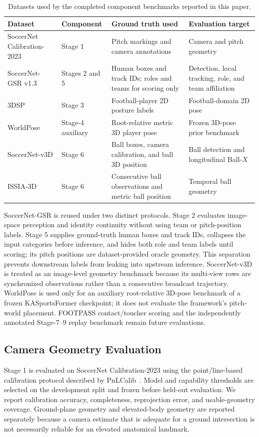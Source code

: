 \documentclass[runningheads]{llncs}
\begin{document}
\begin{table}[t]
\caption{Datasets used by the completed component benchmarks reported in this paper.}
\label{tab:datasets}
\centering\small
\setlength{\tabcolsep}{4pt}
\begin{tabularx}{\textwidth}{@{}p{3.0cm}p{2.4cm}X X@{}}
\toprule
Dataset & Component & Ground truth used & Evaluation target \\
\midrule
SoccerNet Calibration-2023 & Stage 1 & Pitch markings and camera annotations & Camera and pitch geometry \\
SoccerNet-GSR v1.3 & Stages 2 and 5 & Human boxes and track IDs; roles and teams for scoring only & Detection, local tracking, role, and team affiliation \\
3DSP & Stage 3 & Football-player 2D posture labels & Football-domain 2D pose \\
WorldPose & Stage-4 auxiliary & Root-relative metric 3D player pose & Frozen 3D-pose prior benchmark \\
SoccerNet-v3D & Stage 6 & Ball boxes, camera calibration, and ball 3D position & Ball detection and longitudinal Ball-$X$ \\
ISSIA-3D & Stage 6 & Consecutive ball observations and metric ball position & Temporal ball geometry \\
\bottomrule
\end{tabularx}
\end{table}

SoccerNet-GSR is reused under two distinct protocols. Stage 2 evaluates image-space perception and identity continuity without using team or pitch-position labels. Stage 5 supplies ground-truth human boxes and track IDs, collapses the input categories before inference, and hides both role and team labels until scoring; its pitch positions are dataset-provided oracle geometry. This separation prevents downstream labels from leaking into upstream inference. SoccerNet-v3D is treated as an image-level geometry benchmark because its multi-view rows are synchronized observations rather than a consecutive broadcast trajectory. WorldPose is used only for an auxiliary root-relative 3D-pose benchmark of a frozen KASportsFormer checkpoint; it does not evaluate the framework's pitch-world placement. FOOTPASS contact/toucher scoring and the independently annotated Stage-7--9 replay benchmark remain future evaluations.

\subsection{Camera Geometry Evaluation}
\label{subsec:calibration_eval}
Stage 1 is evaluated on SoccerNet Calibration-2023 using the point/line-based calibration protocol described by PnLCalib~\cite{pnlcalib}. Model and capability thresholds are selected on the development split and frozen before held-out evaluation. We report calibration accuracy, completeness, reprojection error, and usable-geometry coverage. Ground-plane geometry and elevated-body geometry are reported separately because a camera estimate that is adequate for a ground intersection is not necessarily reliable for an elevated anatomical landmark.
\end{document}
